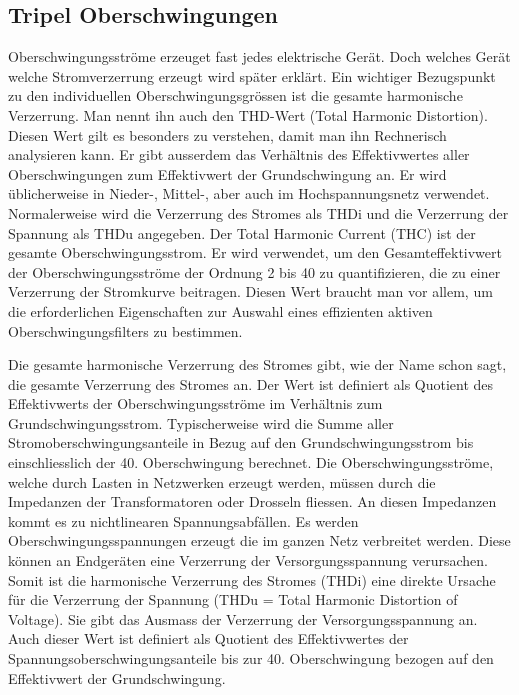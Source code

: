 \subsection{Tripel Oberschwingungen}
Oberschwingungsströme erzeuget fast jedes elektrische Gerät. Doch welches Gerät welche Stromverzerrung erzeugt wird später erklärt. Ein wichtiger Bezugspunkt zu den individuellen Oberschwingungsgrössen ist die gesamte harmonische Verzerrung. Man nennt ihn auch den THD-Wert (Total Harmonic Distortion). Diesen Wert gilt es besonders zu verstehen, damit man ihn Rechnerisch analysieren kann. Er gibt ausserdem das Verhältnis des Effektivwertes aller Oberschwingungen zum Effektivwert der Grundschwingung an. Er wird üblicherweise in Nieder-, Mittel-, aber auch im Hochspannungsnetz verwendet. Normalerweise wird die Verzerrung des Stromes als THDi und die Verzerrung der Spannung als THDu angegeben. Der Total Harmonic Current (THC) ist der gesamte Oberschwingungsstrom. Er wird verwendet, um den Gesamteffektivwert der Oberschwingungsströme der Ordnung 2 bis 40 zu quantifizieren, die zu einer Verzerrung der Stromkurve beitragen. Diesen Wert braucht man vor allem, um die erforderlichen Eigenschaften zur Auswahl eines effizienten aktiven Oberschwingungsfilters zu bestimmen.


Die gesamte harmonische Verzerrung des Stromes gibt, wie der Name schon sagt, die gesamte Verzerrung des Stromes an. Der Wert ist definiert als Quotient des Effektivwerts der Oberschwingungsströme im Verhältnis zum Grundschwingungsstrom. Typischerweise wird die Summe aller Stromoberschwingungsanteile in Bezug auf den Grundschwingungsstrom bis einschliesslich der 40. Oberschwingung berechnet. Die Oberschwingungsströme, welche durch Lasten in Netzwerken erzeugt werden, müssen durch die Impedanzen der Transformatoren oder Drosseln fliessen. An diesen Impedanzen kommt es zu nichtlinearen Spannungsabfällen. Es werden Oberschwingungsspannungen erzeugt die im ganzen Netz verbreitet werden. Diese können an Endgeräten eine Verzerrung der Versorgungsspannung verursachen. Somit ist die harmonische Verzerrung des Stromes (THDi) eine direkte Ursache für die Verzerrung der Spannung (THDu = Total Harmonic Distortion of Voltage). Sie gibt das Ausmass der Verzerrung der Versorgungsspannung an. Auch dieser Wert ist definiert als Quotient des Effektivwertes der Spannungsoberschwingungsanteile bis zur 40. Oberschwingung bezogen auf den Effektivwert der Grundschwingung. 


